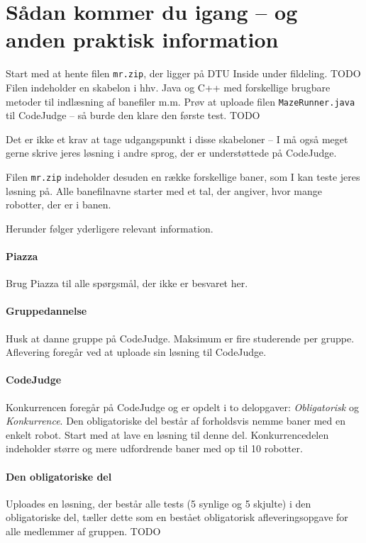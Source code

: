 \documentclass[10pt, a4paper]{article}
\begin{document}
\section{Sådan kommer du igang -- og anden praktisk information}
Start med at hente filen \texttt{mr.zip}, der ligger på DTU Inside under fildeling. TODO
Filen indeholder en skabelon i hhv. Java og C++ med forskellige brugbare metoder til indlæsning af banefiler m.m.
Prøv at uploade filen \texttt{MazeRunner.java} til CodeJudge -- så burde den klare den første test. TODO

Det er ikke et krav at tage udgangspunkt i disse skabeloner -- I må også meget gerne skrive jeres løsning i andre sprog, der er understøttede på CodeJudge.

Filen \texttt{mr.zip} indeholder desuden en række forskellige baner, som I kan teste jeres løsning på.
Alle banefilnavne starter med et tal, der angiver, hvor mange robotter, der er i banen.

Herunder følger yderligere relevant information.

\paragraph{Piazza} Brug Piazza til alle spørgsmål, der ikke er besvaret her.

\paragraph{Gruppedannelse} Husk at danne gruppe på CodeJudge.
Maksimum er fire studerende per gruppe.
Aflevering foregår ved at uploade sin løsning til CodeJudge.

\paragraph{CodeJudge} Konkurrencen foregår på CodeJudge og er opdelt i to delopgaver: \emph{Obligatorisk} og \emph{Konkurrence}.
Den obligatoriske del består af forholdsvis nemme baner med en enkelt robot.
Start med at lave en løsning til denne del.
Konkurrencedelen indeholder større og mere udfordrende baner med op til 10 robotter.

\paragraph{Den obligatoriske del} Uploades en løsning, der består alle tests (5 synlige og 5 skjulte) i den obligatoriske del, tæller dette som en bestået obligatorisk afleveringsopgave for alle medlemmer af gruppen. TODO
\end{document}
